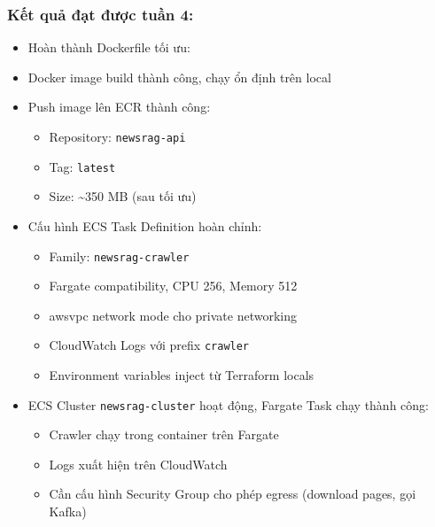 \hypertarget{kux1ebft-quux1ea3-ux111ux1ea1t-ux111ux1b0ux1ee3c-tuux1ea7n-4}{%
\subsubsection{Kết quả đạt được tuần
4:}}

\begin{itemize}
\item
  Hoàn thành Dockerfile tối ưu:

\begin{Shaded}
\begin{Highlighting}[]
 \KeywordTok{\&\&} 
  
\NormalTok{ [}\NormalTok{, }\NormalTok{, }\NormalTok{, }\NormalTok{]}
\end{Highlighting}
\end{Shaded}
\item
  Docker image build thành công, chạy ổn định trên local
\item
  Push image lên ECR thành công:

  \begin{itemize}
  \tightlist
  \item
    Repository: \texttt{newsrag-api}
  \item
    Tag: \texttt{latest}
  \item
    Size: \textasciitilde350 MB (sau tối ưu)
  \end{itemize}
\item
  Cấu hình ECS Task Definition hoàn chỉnh:

  \begin{itemize}
  \tightlist
  \item
    Family: \texttt{newsrag-crawler}
  \item
    Fargate compatibility, CPU 256, Memory 512
  \item
    awsvpc network mode cho private networking
  \item
    CloudWatch Logs với prefix \texttt{crawler}
  \item
    Environment variables inject từ Terraform locals
  \end{itemize}
\item
  ECS Cluster \texttt{newsrag-cluster} hoạt động, Fargate Task chạy
  thành công:

  \begin{itemize}
  \tightlist
  \item
    Crawler chạy trong container trên Fargate
  \item
    Logs xuất hiện trên CloudWatch
  \item
    Cần cấu hình Security Group cho phép egress (download pages, gọi
    Kafka)
  \end{itemize}
\end{itemize}
